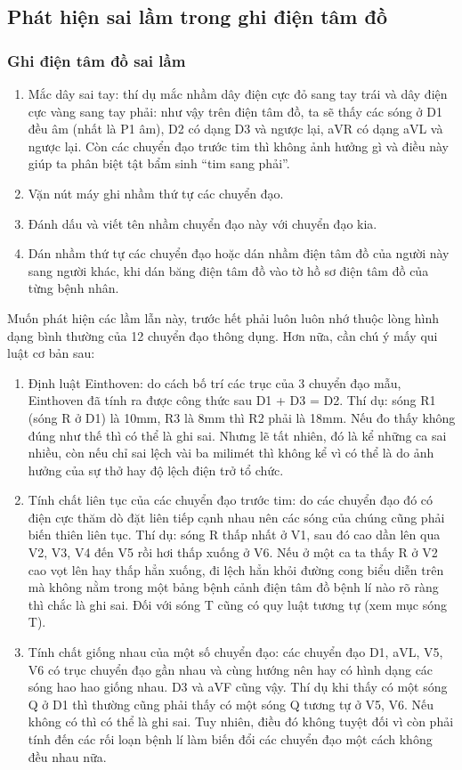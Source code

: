 \subsection{Phát hiện sai lầm trong ghi điện tâm đồ}
\subsubsection{Ghi điện tâm đồ sai lầm}
\begin{enumerate}
    \item Mắc dây sai tay: thí dụ mắc nhầm dây điện cực đỏ sang tay trái và dây điện cực vàng sang tay phải: như vậy trên điện tâm đồ, ta sẽ thấy các sóng ở D1 đều âm (nhất là P1 âm), D2 có dạng D3 và ngược lại, aVR có dạng aVL và ngược lại. Còn các chuyển đạo trước tim thì không ảnh hưởng gì và điều này giúp ta phân biệt tật bẩm sinh “tim sang phải”.
    \item Vặn nút máy ghi nhầm thứ tự các chuyển đạo.
    \item Đánh dấu và viết tên nhầm chuyển đạo này với chuyển đạo kia.
    \item Dán nhầm thứ tự các chuyển đạo hoặc dán nhầm điện tâm đồ của người này sang người khác, khi dán băng điện tâm đồ vào tờ hồ sơ điện tâm đồ của từng bệnh nhân.
\end{enumerate}
Muốn phát hiện các lầm lẫn này, trước hết phải luôn luôn nhớ thuộc lòng hình dạng bình thường của 12 chuyển đạo thông dụng. Hơn nữa, cần chú ý mấy qui luật cơ bản sau:
\begin{enumerate}
    \item Định luật Einthoven: do cách bố trí các trục của 3 chuyển đạo mẫu, Einthoven đã tính ra được công thức sau D1 + D3 = D2. Thí dụ: sóng R1 (sóng R ở D1) là 10mm, R3 là 8mm thì R2 phải là 18mm. Nếu đo thấy không đúng như thế thì có thể là ghi sai. Nhưng lẽ tất nhiên, đó là kể những ca sai nhiều, còn nếu chỉ sai lệch vài ba milimét thì không kể vì có thể là do ảnh hưởng của sự thở hay độ lệch điện trở tổ chức.
    \item Tính chất liên tục của các chuyển đạo trước tim: do các chuyển đạo đó có điện cực thăm dò đặt liên tiếp cạnh nhau nên các sóng của chúng cũng phải biến thiên liên tục. Thí dụ: sóng R thấp nhất ở V1, sau đó cao dần lên qua V2, V3, V4 đến V5 rồi hơi thấp xuống ở V6. Nếu ở một ca ta thấy R ở V2 cao vọt lên hay thấp hẳn xuống, đi lệch hẳn khỏi đường cong biểu diễn trên mà không nằm trong một bảng bệnh cảnh điện tâm đồ bệnh lí nào rõ ràng thì chắc là ghi sai. Đối với sóng T cũng có quy luật tương tự (xem mục sóng T).
    \item Tính chất giống nhau của một số chuyển đạo: các chuyển đạo D1, aVL, V5, V6 có trục chuyển đạo gần nhau và cùng hướng nên hay có hình dạng các sóng hao hao giống nhau. D3 và aVF cũng vậy. Thí dụ khi thấy có một sóng Q ở D1 thì thường cũng phải thấy có một sóng Q tương tự ở V5, V6. Nếu không có thì có thể là ghi sai. Tuy nhiên, điều đó không tuyệt đối vì còn phải tính đến các rối loạn bệnh lí làm biến đổi các chuyển đạo một cách không đều nhau nữa.
\end{enumerate}
